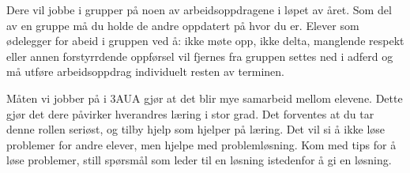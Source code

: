 \documentclass[12pt,a4paper]{article}
\begin{document}
\noindent
{} Dere vil jobbe i grupper på noen av arbeidsoppdragene i løpet av året. Som del av en gruppe må du holde de andre oppdatert på hvor du er. Elever som ødelegger for abeid i gruppen  ved å: ikke møte opp, ikke delta, manglende respekt eller annen forstyrrdende oppførsel vil fjernes fra gruppen settes ned i adferd og må utføre arbeidsoppdrag individuelt resten av terminen. 
\vskip 10pt

\noindent
{} Måten vi jobber på i 3AUA gjør at det blir mye samarbeid mellom elevene. Dette gjør det dere påvirker hverandres læring i stor grad. Det forventes at du tar denne rollen seriøst, og tilby hjelp som hjelper på læring. Det vil si å ikke løse problemer for andre elever, men hjelpe med problemløsning. Kom med tips for å løse problemer, still spørsmål som leder til en løsning istedenfor å gi en løsning. 
\vskip 10pt



%
\end{document}
